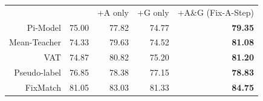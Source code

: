 \begin{tabular}{r | r | r | r | r}
             & ~~~~ & +A only & +G only & +A\&G (Fix-A-Step)
\\ 
    Pi-Model & 75.00 & 77.82 & 74.77 & \textbf{79.35} 
\\ 
    Mean-Teacher & 74.33 & 79.63 & 74.52 & \textbf{81.08}
\\ 
    VAT & 74.87 & 80.82 & 75.20 & \textbf{81.20}
\\
    Pseudo-label & 76.85 & 78.38 & 77.15 & \textbf{78.83}
\\
    FixMatch & 81.05 & 83.03 & 81.33 & \textbf{84.75}
\end{tabular}